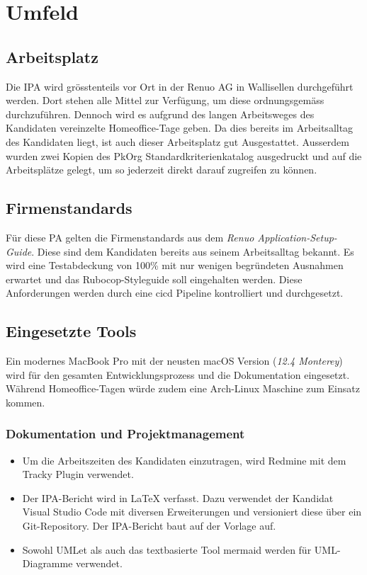 \chapter{Umfeld} \label{ch:environment}

\section{Arbeitsplatz}

Die IPA wird grösstenteils vor Ort in der Renuo AG in Wallisellen durchgeführt werden.
Dort stehen alle Mittel zur Verfügung, um diese ordnungsgemäss durchzuführen.
Dennoch wird es aufgrund des langen Arbeitsweges des Kandidaten vereinzelte Homeoffice-Tage geben. Da dies
bereits im Arbeitsalltag des Kandidaten liegt, ist auch dieser Arbeitsplatz gut Ausgestattet.
Ausserdem wurden zwei Kopien des PkOrg Standardkriterienkatalog ausgedruckt und auf die Arbeitsplätze gelegt,
um so jederzeit direkt darauf zugreifen zu können.

\section{Firmenstandards}

Für diese PA gelten die Firmenstandards aus dem \emph{Renuo Application-Setup-Guide}. Diese sind
dem Kandidaten bereits aus seinem Arbeitsalltag bekannt. Es wird eine Testabdeckung von 100\% mit nur wenigen begründeten Ausnahmen erwartet
und das Rubocop-Styleguide soll eingehalten werden. Diese Anforderungen werden durch eine \gls{cicd} Pipeline kontrolliert und durchgesetzt.

\section{Eingesetzte Tools} \label{sec:tools}

Ein modernes MacBook Pro mit der neusten macOS Version (\emph{12.4 Monterey}) wird für den gesamten Entwicklungsprozess und die Dokumentation eingesetzt.
Während Homeoffice-Tagen würde zudem eine Arch-Linux Maschine zum Einsatz kommen.

\subsection{Dokumentation und Projektmanagement}

\begin{itemize}
    \item Um die Arbeitszeiten des Kandidaten einzutragen, wird Redmine mit dem Tracky Plugin verwendet.
    \item Der IPA-Bericht wird in LaTeX verfasst. Dazu verwendet der Kandidat Visual Studio Code mit diversen Erweiterungen
          und versioniert diese über ein Git-Repository. Der IPA-Bericht baut auf der Vorlage \cite{Buhler_ipa-template_2022} auf.
    \item Sowohl UMLet als auch das textbasierte Tool mermaid werden für UML-Diagramme verwendet.
\end{itemize}

